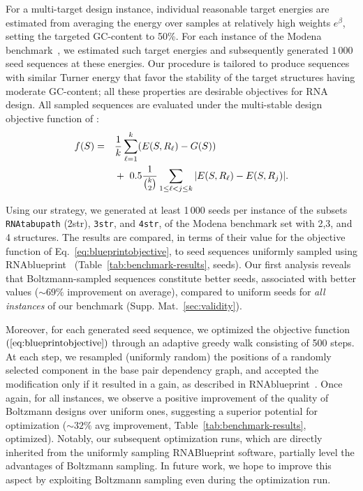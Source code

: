 \documentclass{bioinfo}
\newcommand{\Nuc}[1]{{\sf #1}}
\newcommand{\Cb}{\Nuc{C}}
\newcommand{\Gb}{\Nuc{G}}
\newcommand{\GCb}{\Gb\Cb}
\newcommand{\Software}[1]{{\ttfamily #1}}
\begin{document}
For a multi-target design instance, individual reasonable target
energies are estimated from averaging the energy over samples at
relatively high weights $e^{\beta}$, setting the targeted \GCb-content
to 50\%. For each instance of the \Software{Modena}
benchmark~\citep{Taneda2015}, we estimated such target energies and
subsequently generated $1\,000$ seed sequences at these energies.
Our procedure is tailored to produce sequences with similar Turner
energy that favor the stability of the target structures having
moderate \GCb-content; all these properties are desirable objectives
for RNA design.  All sampled sequences are evaluated under the
multi-stable design objective function of \citet{Hammer2017}:
\begin{align}
  \label{eq:blueprintobjective}
    f(S)= \quad & \frac{1}{k} \sum_{\ell=1}^{k} (E(S, R_\ell) - G(S))\notag\\
   & +\ 0.5\frac{1}{\binom{k}{2}} \sum\limits_{1\leq\ell<j\leq k}|E(S,R_\ell) - E(S,R_j)|.
\end{align}

Using our strategy, we generated at least 1\,000 seeds per instance of
the subsets \texttt{RNAtabupath} (2str), \texttt{3str}, and \texttt{4str}, of
the \Software{Modena} benchmark set with 2,3, and 4 structures. The
results are compared, in terms of their value for the objective
function of Eq.~\eqref{eq:blueprintobjective}, to seed sequences
uniformly sampled using \Software{RNAblueprint}~\citep{Hammer2017}
(Table~\ref{tab:benchmark-results}, seeds). Our first analysis reveals
that Boltzmann-sampled sequences constitute better seeds, associated
with better values ($\sim\! 69\%$ improvement on average), compared to
uniform seeds for \emph{all instances} of our benchmark
(Supp. Mat.~\ref{sec:validity}).

Moreover, for each generated seed sequence, we optimized the objective function $(\ref{eq:blueprintobjective})$ through an adaptive  greedy walk consisting of 500 steps. At each step, we resampled (uniformly random) the positions of a randomly selected component in the base pair dependency graph, and accepted the modification only if it resulted in a gain, as described in \Software{RNAblueprint}~\citep{Hammer2017}.
%
Once again, for all instances, we observe a positive improvement of
the quality of Boltzmann designs over uniform ones, suggesting a
superior potential for optimization ($\sim 32\%$ avg improvement,
Table~\ref{tab:benchmark-results}, optimized). Notably, our subsequent
optimization runs, which are directly inherited from the uniformly
sampling RNABlueprint software, partially level the advantages of
Boltzmann sampling. In future work, we hope to improve this aspect by
exploiting Boltzmann sampling even during the optimization run.
\end{document}
